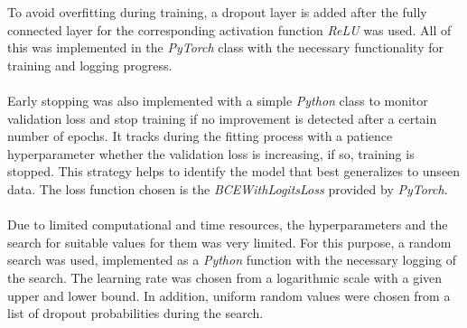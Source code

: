 \documentclass[a4paper, 11pt]{article}
\begin{document}
    To avoid overfitting during training, a dropout layer is added after the fully connected layer for the corresponding activation function \textit{ReLU} was used. All of this was implemented in the \textit{PyTorch} class with the necessary functionality for training and logging progress. \\\\
    Early stopping was also implemented with a simple \textit{Python} class to monitor validation loss and stop training if no improvement is detected after a certain number of epochs. It tracks during the fitting process with a patience hyperparameter whether the validation loss is increasing, if so, training is stopped. This strategy helps to identify the model that best generalizes to unseen data. The loss function chosen is the \textit{BCEWithLogitsLoss} provided by \textit{PyTorch}. \\\\
    Due to limited computational and time resources, the hyperparameters and the search for suitable values for them was very limited. For this purpose, a random search was used, implemented as a \textit{Python} function with the necessary logging of the search. The learning rate was chosen from a logarithmic scale with a given upper and lower bound. In addition, uniform random values were chosen from a list of dropout probabilities during the search. 
\end{document}
